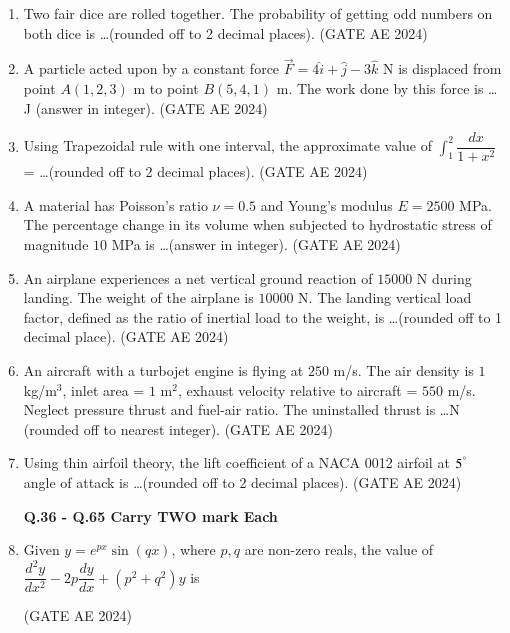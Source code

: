 \documentclass[journal,12pt,onecolumn]{IEEEtran}
\theoremstyle{remark}
\begin{document}
\begin{enumerate}
\item Two fair dice are rolled together. The probability of getting odd numbers on both dice is \dots (rounded off to 2 decimal places).  
\hfill(GATE AE 2024)

\item A particle acted upon by a constant force $\vec{F} = 4\hat{i} + \hat{j} - 3\hat{k}$ N is displaced from point $A(1,2,3)$ m to point $B(5,4,1)$ m. The work done by this force is \dots J (answer in integer).  
\hfill(GATE AE 2024)

\item Using Trapezoidal rule with one interval, the approximate value of $\int_1^2 \dfrac{dx}{1+x^2}$ = \dots (rounded off to 2 decimal places).  
\hfill(GATE AE 2024)

\item A material has Poisson's ratio $\nu = 0.5$ and Young's modulus $E = 2500$ MPa. The percentage change in its volume when subjected to hydrostatic stress of magnitude $10$ MPa is \dots (answer in integer).  
\hfill(GATE AE 2024)

\item An airplane experiences a net vertical ground reaction of $15000$ N during landing. The weight of the airplane is $10000$ N. The landing vertical load factor, defined as the ratio of inertial load to the weight, is \dots (rounded off to 1 decimal place).  
\hfill(GATE AE 2024)

\item An aircraft with a turbojet engine is flying at $250$ m/s. The air density is $1$ kg/m$^3$, inlet area = $1$ m$^2$, exhaust velocity relative to aircraft = $550$ m/s. Neglect pressure thrust and fuel-air ratio. The uninstalled thrust is \dots N (rounded off to nearest integer).  
\hfill(GATE AE 2024)

\item Using thin airfoil theory, the lift coefficient of a NACA 0012 airfoil at $5^\degree$ angle of attack is \dots (rounded off to 2 decimal places).  
\hfill(GATE AE 2024)

\textbf{Q.36 - Q.65 Carry TWO mark Each}

\item Given $y = e^{px}\sin(qx)$, where $p,q$ are non-zero reals, the value of  
$\dfrac{d^2y}{dx^2} - 2p\dfrac{dy}{dx} + (p^2+q^2)y$ is  
\begin{enumerate}
\end{enumerate}
\hfill(GATE AE 2024)


\end{enumerate}
\end{document}
